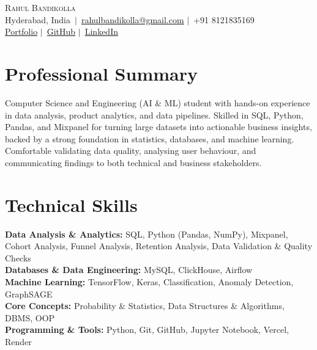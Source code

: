 \documentclass[11pt,a4paper]{article}
\begin{document}
\begin{center}
{\Huge \scshape Rahul Bandikolla}\\[1pt]
\small Hyderabad, India\ $\vert$\
\href{mailto:rahulbandikolla@gmail.com}{rahulbandikolla@gmail.com} $\vert$\
+91 8121835169\\[1pt]
\href{https://b-rahul-portfolio.vercel.app/}{Portfolio} $\vert$\
\href{https://github.com/b-rahul07}{GitHub} $\vert$\
\href{https://www.linkedin.com/in/rahul-bandikolla-br07/}{LinkedIn}
\end{center}
\section{Professional Summary}
\vspace{1pt}
Computer Science and Engineering (AI \& ML) student with hands-on experience in data analysis, product analytics, and data pipelines. Skilled in SQL, Python, Pandas, and Mixpanel for turning large datasets into actionable business insights, backed by a strong foundation in statistics, databases, and machine learning. Comfortable validating data quality, analysing user behaviour, and communicating findings to both technical and business stakeholders.
\section{Technical Skills}
\vspace{1pt}
\textbf{Data Analysis \& Analytics:} SQL, Python (Pandas, NumPy), Mixpanel, Cohort Analysis, Funnel Analysis, Retention Analysis, Data Validation \& Quality Checks\\
\textbf{Databases \& Data Engineering:} MySQL, ClickHouse, Airflow\\
\textbf{Machine Learning:} TensorFlow, Keras, Classification, Anomaly Detection, GraphSAGE\\
\textbf{Core Concepts:} Probability \& Statistics, Data Structures \& Algorithms, DBMS, OOP\\
\textbf{Programming \& Tools:} Python, Git, GitHub, Jupyter Notebook, Vercel, Render
\end{document}
